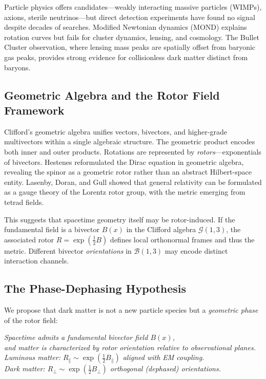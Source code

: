 \documentclass[11pt,a4paper]{article}
\numberwithin{equation}{section}
\theoremstyle{plain}
\theoremstyle{definition}
\theoremstyle{remark}
\newcommand{\Cl}{\mathcal{G}}               %
\newcommand{\bivec}{\mathcal{B}}            %
\begin{document}
Particle physics offers candidates---weakly interacting massive particles (WIMPs), axions, sterile neutrinos---but direct detection experiments have found no signal despite decades of searches. Modified Newtonian dynamics (MOND) explains rotation curves but fails for cluster dynamics, lensing, and cosmology. The Bullet Cluster observation, where lensing mass peaks are spatially offset from baryonic gas peaks, provides strong evidence for collisionless dark matter distinct from baryons.

\subsection{Geometric Algebra and the Rotor Field Framework}

Clifford's geometric algebra unifies vectors, bivectors, and higher-grade multivectors within a single algebraic structure. The geometric product encodes both inner and outer products. Rotations are represented by \emph{rotors}---exponentials of bivectors. Hestenes reformulated the Dirac equation in geometric algebra, revealing the spinor as a geometric rotor rather than an abstract Hilbert-space entity. Lasenby, Doran, and Gull showed that general relativity can be formulated as a gauge theory of the Lorentz rotor group, with the metric emerging from tetrad fields.

This suggests that spacetime geometry itself may be rotor-induced. If the fundamental field is a bivector $B(x)$ in the Clifford algebra $\Cl(1,3)$, the associated rotor $R=\exp(\tfrac12 B)$ defines local orthonormal frames and thus the metric. Different bivector \emph{orientations} in $\bivec(1,3)$ may encode distinct interaction channels.

\subsection{The Phase-Dephasing Hypothesis}

We propose that dark matter is not a new particle species but a \emph{geometric phase} of the rotor field:

\begin{center}
\textit{Spacetime admits a fundamental bivector field $B(x)$, \\
and matter is characterized by rotor orientation relative to observational planes. \\
Luminous matter: $R_\parallel \sim \exp(\tfrac12 B_\parallel)$ aligned with EM coupling. \\
Dark matter: $R_\perp \sim \exp(\tfrac12 B_\perp)$ orthogonal (dephased) orientations.}
\end{center}
\end{document}
